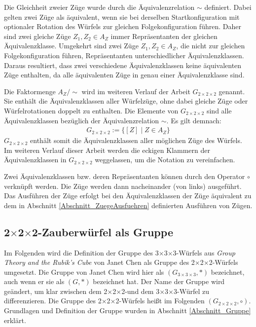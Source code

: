 \documentclass[12pt,a4paper, usenames, dvipsnames]{article}
\theoremstyle{mystyle}
\theoremstyle{definition}
\newcommand{\Gtwo}{\ensuremath{G_{2\times 2\times 2}}}
\newcommand{\Gthree}{\ensuremath{G_{3\times 3\times 3}}}
\newcommand{\Ttwo}{2$\times$2$\times$2-}
\newcommand{\Tthree}{3$\times$3$\times$3-}
\begin{document}
Die Gleichheit zweier Züge wurde durch die Äquivalenzrelation $\sim$ definiert. Dabei gelten zwei Züge als äquivalent, wenn sie bei derselben Startkonfiguration mit optionaler Rotation des Würfels zur gleichen Folgekonfiguration führen. Daher sind zwei gleiche Züge $Z_1, Z_2 \in A_Z$ immer Repräsentanten der gleichen Äquivalenzklasse. Umgekehrt sind zwei Züge $Z_1, Z_2 \in A_Z$, die nicht zur gleichen Folgekonfiguration führen, Repräsentanten unterschiedlicher Äquivalenzklassen.
Daraus resultiert, dass zwei verschiedene Äquivalenzklassen keine äquivalenten Züge enthalten, da alle äquivalenten Züge in genau einer Äquivalenzklasse sind. 

Die Faktormenge $A_Z / \sim$ wird im weiteren Verlauf der Arbeit $\Gtwo$ genannt. Sie enthält die Äquivalenzklassen aller Würfelzüge, ohne dabei gleiche Züge oder Würfelrotationen doppelt zu enthalten.
Die Elemente von $\Gtwo$ sind alle Äquivalenzklassen bezüglich der Äquivalenzrelation $\sim$. Es gilt demnach:
\begin{align*}
\Gtwo := \{[Z] \mid Z \in A_Z \}
\end{align*}
$\Gtwo$ enthält somit die Äquivalenzklassen aller möglichen Züge des Würfels. 
Im weiteren Verlauf dieser Arbeit werden die eckigen Klammern der Äquivalenzklassen in $\Gtwo$ weggelassen, um die Notation zu vereinfachen.

Zwei Äquivalenzklassen bzw. deren Repräsentanten können durch den Operator $\circ$ verknüpft werden. Die Züge werden dann nacheinander (von links) ausgeführt. Das Ausführen der Züge erfolgt bei den Äquivalenzklassen der Züge äquivalent zu dem in Abschnitt \ref{Abschnitt_ZuegeAusfuehren} definierten Ausführen von Zügen.

%
%
%
%
%
%
%
%
%
%
%
%
%
%
%
%
%
%
%

\subsection{\Ttwo Zauberwürfel als Gruppe} 
 \label{Abschnitt_WürfelAlsGruppe}

Im Folgenden wird die Definition der Gruppe des \Tthree Würfels aus \textit{Group Theory and the Rubik's Cube}  von Janet Chen \cite{JC} als Gruppe des \Ttwo Würfels umgesetzt. Die Gruppe von Janet Chen wird hier als $(\Gthree, *)$ bezeichnet, auch wenn er sie als $(G, *)$ bezeichnet hat. Der Name der Gruppe wird geändert, um klar zwischen dem \Ttwo  und dem \Tthree Würfel zu differenzieren. Die Gruppe des \Ttwo Würfels heißt im Folgenden $(\Gtwo, \circ)$. 
Grundlagen und Definition der Gruppe wurden in Abschnitt \ref{Abschnitt_Gruppe} erklärt.
\end{document}
